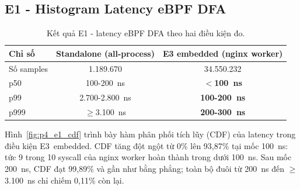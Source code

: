 \documentclass[../main.tex]{subfiles}
\begin{document}
\subsection{E1 - Histogram Latency eBPF DFA}
\label{subsec:p4_e1}

\begin{table}[H]
  \caption{Kết quả E1 - latency eBPF DFA theo hai điều kiện đo.}
  \label{tab:p4_e1}
  \centering
  \begin{tabular}{|l|c|c|}
    \hline
    \textbf{Chỉ số} & \textbf{Standalone (all-process)} &
    \textbf{E3 embedded (nginx worker)} \\ \hline
    Số samples         & 1.189.670   & 34.550.232           \\ \hline
    p50                & 100-200~ns  & \textbf{$<$100~ns}   \\ \hline
    p99                & 2.700-2.800~ns & \textbf{100-200~ns} \\ \hline
    p999               & $\geq$3.100~ns & \textbf{200-300~ns} \\ \hline
  \end{tabular}
\end{table}

Hình~\ref{fig:p4_e1_cdf} trình bày hàm phân phối tích lũy (CDF) của
latency trong điều kiện E3~embedded. CDF tăng đột ngột từ 0\% lên
93,87\% tại mốc 100~ns: tức 9 trong 10 \gls{syscall} của nginx worker hoàn
thành trong dưới 100~ns. Sau mốc 200~ns, CDF đạt 99,89\% và gần như
bằng phẳng; toàn bộ đuôi từ 200~ns đến $\geq$3.100~ns chỉ chiếm
0,11\% còn lại.
\end{document}
